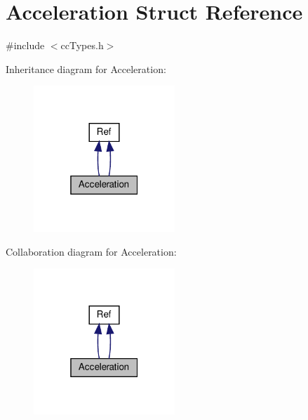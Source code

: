 \hypertarget{classAcceleration}{}\section{Acceleration Struct Reference}
\label{classAcceleration}


{\ttfamily \#include $<$cc\+Types.\+h$>$}



Inheritance diagram for Acceleration\+:
\nopagebreak
\begin{figure}[H]
\begin{center}
\leavevmode
\includegraphics[width=151pt]{classAcceleration__inherit__graph}
\end{center}
\end{figure}


Collaboration diagram for Acceleration\+:
\nopagebreak
\begin{figure}[H]
\begin{center}
\leavevmode
\includegraphics[width=151pt]{classAcceleration__coll__graph}
\end{center}
\end{figure}
